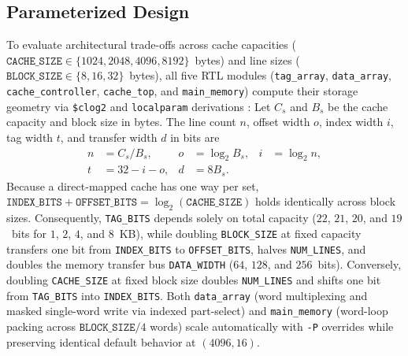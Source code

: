\documentclass[conference]{IEEEtran}
\begin{document}
\subsection{Parameterized Design}
To evaluate architectural trade-offs across cache capacities ($\texttt{CACHE\_SIZE} \in \{1024, 2048, 4096, 8192\}$~bytes) and line sizes ($\texttt{BLOCK\_SIZE} \in \{8, 16, 32\}$~bytes), all five RTL modules (\texttt{tag\_array}, \texttt{data\_array}, \texttt{cache\_controller}, \texttt{cache\_top}, and \texttt{main\_memory}) compute their storage geometry via \texttt{\$clog2} and \texttt{localparam} derivations \cite{hennessy2019computer, patterson2020computer}:
Let $C_s$ and $B_s$ be the cache capacity and block size in bytes. The line count $n$, offset width $o$, index width $i$, tag width $t$, and transfer width $d$ in bits are
\begin{align}
n &= C_s/B_s, & o &= \log_2 B_s, & i &= \log_2 n,\\
t &= 32-i-o, & d &= 8 B_s.
\end{align}
Because a direct-mapped cache has one way per set, $\texttt{INDEX\_BITS} + \texttt{OFFSET\_BITS} = \log_2(\texttt{CACHE\_SIZE})$ holds identically across block sizes. Consequently, \texttt{TAG\_BITS} depends solely on total capacity ($22$, $21$, $20$, and $19$~bits for $1$, $2$, $4$, and $8$~KB), while doubling \texttt{BLOCK\_SIZE} at fixed capacity transfers one bit from \texttt{INDEX\_BITS} to \texttt{OFFSET\_BITS}, halves \texttt{NUM\_LINES}, and doubles the memory transfer bus \texttt{DATA\_WIDTH} ($64$, $128$, and $256$~bits). Conversely, doubling \texttt{CACHE\_SIZE} at fixed block size doubles \texttt{NUM\_LINES} and shifts one bit from \texttt{TAG\_BITS} into \texttt{INDEX\_BITS}. Both \texttt{data\_array} (word multiplexing and masked single-word write via indexed part-select) and \texttt{main\_memory} (word-loop packing across $\texttt{BLOCK\_SIZE}/4$ words) scale automatically with \texttt{-P} overrides while preserving identical default behavior at $(4096, 16)$.
\end{document}
